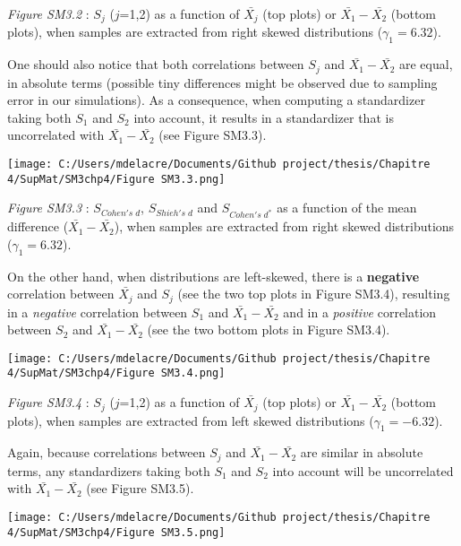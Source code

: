 \documentclass[
  english,
  man,mask,floatsintext]{apa6}
\begin{document}
\setlength\parindent{0pt}\emph{Figure SM3.2} : \(S_j\) (\(j\)=1,2) as a function of \(\bar{X_j}\) (top plots) or \(\bar{X_1}-\bar{X_2}\) (bottom plots), when samples are extracted from right skewed distributions (\(\gamma_1 = 6.32\)).

\newpage

\setlength\parindent{24pt}One should also notice that both correlations between \(S_j\) and \(\bar{X_1}-\bar{X_2}\) are equal, in absolute terms (possible tiny differences might be observed due to sampling error in our simulations). As a consequence, when computing a standardizer taking both \(S_1\) and \(S_2\) into account, it results in a standardizer that is uncorrelated with \(\bar{X_1}-\bar{X_2}\) (see Figure SM3.3).

\texttt{[image: C:/Users/mdelacre/Documents/Github project/thesis/Chapitre 4/SupMat/SM3chp4/Figure SM3.3.png]}

\setlength\parindent{0pt}\emph{Figure SM3.3} : \(S_{Cohen's \; d}\), \(S_{Shieh's \; d}\) and \(S_{Cohen's \; d^*}\) as a function of the mean difference (\(\bar{X_1}-\bar{X_2}\)), when samples are extracted from right skewed distributions (\(\gamma_1 = 6.32\)).

\newpage

\setlength\parindent{24pt}On the other hand, when distributions are left-skewed, there is a \textbf{negative} correlation between \(\bar{X_j}\) and \(S_j\) (see the two top plots in Figure SM3.4), resulting in a \emph{negative} correlation between \(S_1\) and \(\bar{X_1}-\bar{X_2}\) and in a \emph{positive} correlation between \(S_2\) and \(\bar{X_1}-\bar{X_2}\) (see the two bottom plots in Figure SM3.4).

\texttt{[image: C:/Users/mdelacre/Documents/Github project/thesis/Chapitre 4/SupMat/SM3chp4/Figure SM3.4.png]}

\setlength\parindent{0pt}\emph{Figure SM3.4} : \(S_j\) (\(j\)=1,2) as a function of \(\bar{X_j}\) (top plots) or \(\bar{X_1}-\bar{X_2}\) (bottom plots), when samples are extracted from left skewed distributions (\(\gamma_1 = -6.32\)).

\newpage

\setlength\parindent{24pt}Again, because correlations between \(S_j\) and \(\bar{X_1}-\bar{X_2}\) are similar in absolute terms, any standardizers taking both \(S_1\) and \(S_2\) into account will be uncorrelated with \(\bar{X_1}-\bar{X_2}\) (see Figure SM3.5).

\texttt{[image: C:/Users/mdelacre/Documents/Github project/thesis/Chapitre 4/SupMat/SM3chp4/Figure SM3.5.png]}
\end{document}

